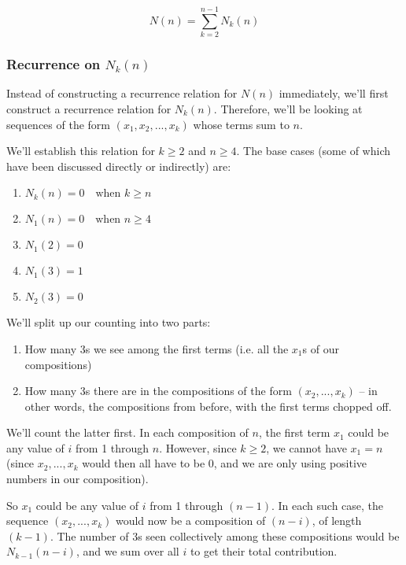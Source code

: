 \begin{equation}
\label{composition-num-3s-n-nk}
N(n) = \sum_{k=2}^{n-1} N_k(n)
\end{equation}

\subsubsection{Recurrence on $N_k(n)$}

Instead of constructing a recurrence relation for $N(n)$ immediately, we'll first construct a recurrence relation for $N_k(n)$. Therefore, we'll be looking at sequences of the form $(x_1, x_2, ..., x_k)$ whose terms sum to $n$.

We'll establish this relation for $k \geq 2$ and $n \geq 4$. The base cases (some of which have been discussed directly or indirectly) are:

\begin{enumerate}
\item $N_k(n) = 0 \quad \text{when } k \geq n$ \label{eqbc-3s-1}
\item $N_1(n) = 0 \quad \text{when } n \geq 4$  \label{eqbc-3s-2}
\item $N_1(2) = 0$  \label{eqbc-3s-3}
\item $N_1(3) = 1$  \label{eqbc-3s-4}
\item $N_2(3) = 0$ \label{hooo}  \label{eqbc-3s-5}
\end{enumerate}


We'll split up our counting into two parts:
\begin{enumerate}
\item How many 3s we see among the first terms (i.e. all the $x_1$s of our compositions)
\item How many 3s there are in the compositions of the form $(x_2, ..., x_k)$ -- in other words, the compositions from before, with the first terms chopped off.
\end{enumerate}

We'll count the latter first. In each composition of $n$, the first term $x_1$ could be any value of $i$ from 1 through $n$. However, since $k \geq 2$, we cannot have $x_1 = n$ (since $x_2, ..., x_k$ would then all have to be 0, and we are only using positive numbers in our composition). 

So $x_1$ could be any value of $i$ from 1 through $(n-1)$. In each such case, the sequence $(x_2, ..., x_k)$ would now be a composition of $(n-i)$, of length $(k-1)$. The number of 3s seen collectively among these compositions would be $N_{k-1}(n-i)$, and we sum over all $i$ to get their total contribution.

